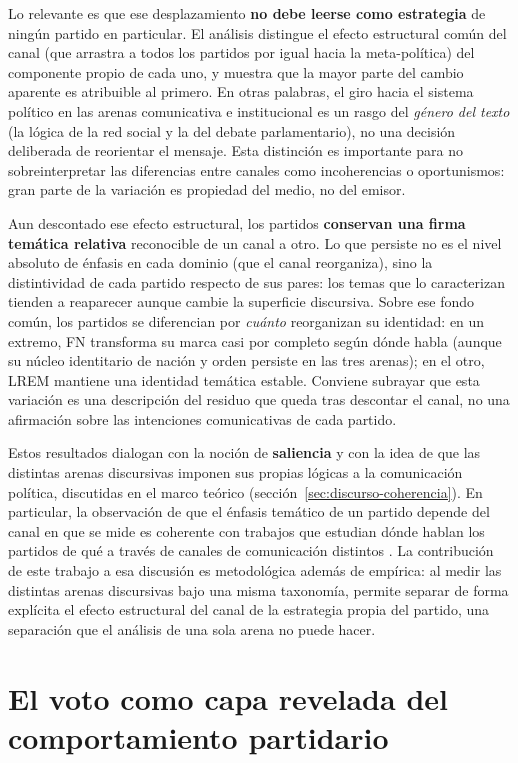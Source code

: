 Lo relevante es que ese desplazamiento \textbf{no debe leerse como estrategia} de
ningún partido en particular. El análisis distingue el efecto estructural común
del canal (que arrastra a todos los partidos por igual hacia la meta-política)
del componente propio de cada uno, y muestra que la mayor parte del cambio
aparente es atribuible al primero. En otras palabras, el giro hacia el sistema
político en las arenas comunicativa e institucional es un rasgo del \emph{género
del texto} (la lógica de la red social y la del debate parlamentario), no una
decisión deliberada de reorientar el mensaje. Esta distinción es importante para
no sobreinterpretar las diferencias entre canales como incoherencias o
oportunismos: gran parte de la variación es propiedad del medio, no del emisor.

Aun descontado ese efecto estructural, los partidos \textbf{conservan una firma
temática relativa} reconocible de un canal a otro. Lo que persiste no es el nivel
absoluto de énfasis en cada dominio (que el canal reorganiza), sino la
distintividad de cada partido respecto de sus pares: los temas que lo
caracterizan tienden a reaparecer aunque cambie la superficie discursiva. Sobre
ese fondo común, los partidos se diferencian por \emph{cuánto} reorganizan su
identidad: en un extremo, FN transforma su marca casi por completo según dónde
habla (aunque su núcleo identitario de nación y orden persiste en las tres
arenas); en el otro, LREM mantiene una identidad temática estable. Conviene
subrayar que esta variación es una descripción del residuo que queda tras
descontar el canal, no una afirmación sobre las intenciones comunicativas de cada
partido.

Estos resultados dialogan con la noción de \textbf{saliencia} y con la idea de que
las distintas arenas discursivas imponen sus propias lógicas a la comunicación
política, discutidas en el marco teórico
(sección~\ref{sec:discurso-coherencia}). En particular, la observación de que el
énfasis temático de un partido depende del canal en que se mide es coherente con
trabajos que estudian dónde hablan los partidos de qué a través de canales de
comunicación distintos \cite{ivanusch2024channels}. La contribución de este
trabajo a esa discusión es metodológica además de empírica: al medir las
distintas arenas discursivas bajo una misma taxonomía, permite separar de forma
explícita el efecto
estructural del canal de la estrategia propia del partido, una separación que el
análisis de una sola arena no puede hacer.

\section{El voto como capa revelada del comportamiento partidario}
\label{sec:disc-voto}

